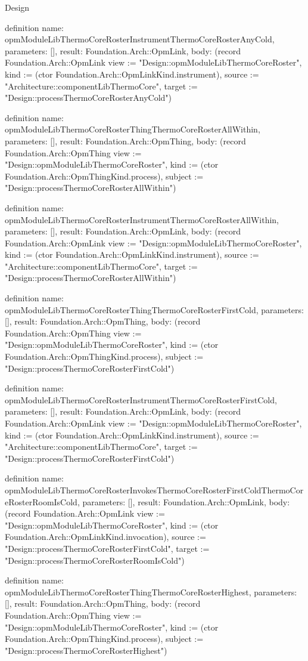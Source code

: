 \begin{lexlean}{Design}
\begin{semanticmodule}
definition{
  name: opmModuleLibThermoCoreRosterInstrumentThermoCoreRosterAnyCold,
  parameters: [],
  result: Foundation.Arch::OpmLink,
  body: (record Foundation.Arch::OpmLink {view := "Design::opmModuleLibThermoCoreRoster", kind := (ctor Foundation.Arch::OpmLinkKind.instrument), source := "Architecture::componentLibThermoCore", target := "Design::processThermoCoreRosterAnyCold"})
}

definition{
  name: opmModuleLibThermoCoreRosterThingThermoCoreRosterAllWithin,
  parameters: [],
  result: Foundation.Arch::OpmThing,
  body: (record Foundation.Arch::OpmThing {view := "Design::opmModuleLibThermoCoreRoster", kind := (ctor Foundation.Arch::OpmThingKind.process), subject := "Design::processThermoCoreRosterAllWithin"})
}

definition{
  name: opmModuleLibThermoCoreRosterInstrumentThermoCoreRosterAllWithin,
  parameters: [],
  result: Foundation.Arch::OpmLink,
  body: (record Foundation.Arch::OpmLink {view := "Design::opmModuleLibThermoCoreRoster", kind := (ctor Foundation.Arch::OpmLinkKind.instrument), source := "Architecture::componentLibThermoCore", target := "Design::processThermoCoreRosterAllWithin"})
}

definition{
  name: opmModuleLibThermoCoreRosterThingThermoCoreRosterFirstCold,
  parameters: [],
  result: Foundation.Arch::OpmThing,
  body: (record Foundation.Arch::OpmThing {view := "Design::opmModuleLibThermoCoreRoster", kind := (ctor Foundation.Arch::OpmThingKind.process), subject := "Design::processThermoCoreRosterFirstCold"})
}

definition{
  name: opmModuleLibThermoCoreRosterInstrumentThermoCoreRosterFirstCold,
  parameters: [],
  result: Foundation.Arch::OpmLink,
  body: (record Foundation.Arch::OpmLink {view := "Design::opmModuleLibThermoCoreRoster", kind := (ctor Foundation.Arch::OpmLinkKind.instrument), source := "Architecture::componentLibThermoCore", target := "Design::processThermoCoreRosterFirstCold"})
}

definition{
  name: opmModuleLibThermoCoreRosterInvokesThermoCoreRosterFirstColdThermoCoreRosterRoomIsCold,
  parameters: [],
  result: Foundation.Arch::OpmLink,
  body: (record Foundation.Arch::OpmLink {view := "Design::opmModuleLibThermoCoreRoster", kind := (ctor Foundation.Arch::OpmLinkKind.invocation), source := "Design::processThermoCoreRosterFirstCold", target := "Design::processThermoCoreRosterRoomIsCold"})
}

definition{
  name: opmModuleLibThermoCoreRosterThingThermoCoreRosterHighest,
  parameters: [],
  result: Foundation.Arch::OpmThing,
  body: (record Foundation.Arch::OpmThing {view := "Design::opmModuleLibThermoCoreRoster", kind := (ctor Foundation.Arch::OpmThingKind.process), subject := "Design::processThermoCoreRosterHighest"})
}


\end{semanticmodule}
\end{lexlean}
